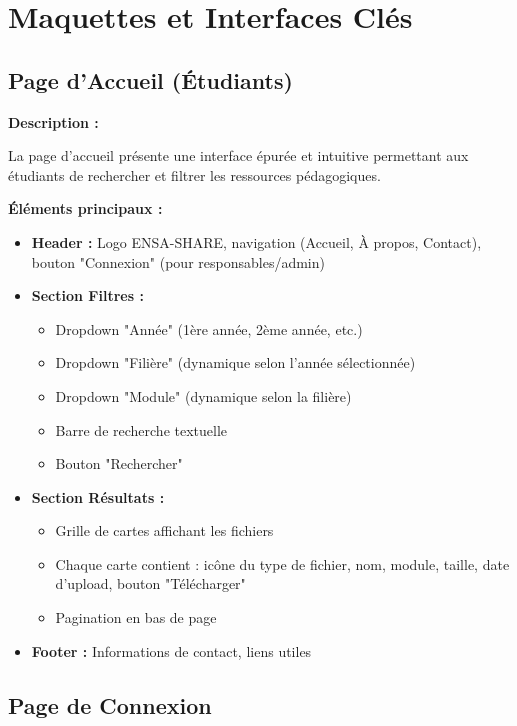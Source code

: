 \documentclass[12pt,a4paper]{article}
\begin{document}
\section{Maquettes et Interfaces Clés}

\subsection{Page d'Accueil (Étudiants)}

\textbf{Description :}

La page d'accueil présente une interface épurée et intuitive permettant aux étudiants de rechercher et filtrer les ressources pédagogiques.

\textbf{Éléments principaux :}
\begin{itemize}[leftmargin=*]
    \item \textbf{Header :} Logo ENSA-SHARE, navigation (Accueil, À propos, Contact), bouton "Connexion" (pour responsables/admin)
    \item \textbf{Section Filtres :} 
    \begin{itemize}
        \item Dropdown "Année" (1ère année, 2ème année, etc.)
        \item Dropdown "Filière" (dynamique selon l'année sélectionnée)
        \item Dropdown "Module" (dynamique selon la filière)
        \item Barre de recherche textuelle
        \item Bouton "Rechercher"
    \end{itemize}
    \item \textbf{Section Résultats :}
    \begin{itemize}
        \item Grille de cartes affichant les fichiers
        \item Chaque carte contient : icône du type de fichier, nom, module, taille, date d'upload, bouton "Télécharger"
        \item Pagination en bas de page
    \end{itemize}
    \item \textbf{Footer :} Informations de contact, liens utiles
\end{itemize}

\subsection{Page de Connexion}
\end{document}
